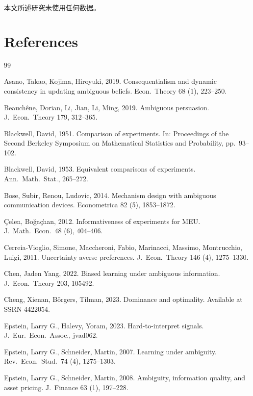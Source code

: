 \documentclass[12pt,a4paper]{article}
\newenvironment{translation}
  {\par\vspace{2pt}\noindent\color{myblue}\ignorespaces}
  {\par\vspace{6pt}}
\newcommand{\bisection}[2]{%
  \section{#1}%
  \vspace{-2pt}%
  \noindent{\color{myblue}\large\bfseries #2}%
  \vspace{6pt}%
}
\begin{document}
\begin{translation}
本文所述研究未使用任何数据。
\end{translation}


\bisection{References}{参考文献}

\begin{thebibliography}{99}

Asano, Takao, Kojima, Hiroyuki, 2019. Consequentialism and dynamic consistency in updating ambiguous beliefs. Econ.\ Theory 68 (1), 223--250.

Beauch\^{e}ne, Dorian, Li, Jian, Li, Ming, 2019. Ambiguous persuasion. J.\ Econ.\ Theory 179, 312--365.

Blackwell, David, 1951. Comparison of experiments. In: Proceedings of the Second Berkeley Symposium on Mathematical Statistics and Probability, pp.\ 93--102.

Blackwell, David, 1953. Equivalent comparisons of experiments. Ann.\ Math.\ Stat., 265--272.

Bose, Subir, Renou, Ludovic, 2014. Mechanism design with ambiguous communication devices. Econometrica 82 (5), 1853--1872.

\c{C}elen, Bo\u{g}a\c{c}han, 2012. Informativeness of experiments for MEU. J.\ Math.\ Econ.\ 48 (6), 404--406.

Cerreia-Vioglio, Simone, Maccheroni, Fabio, Marinacci, Massimo, Montrucchio, Luigi, 2011. Uncertainty averse preferences. J.\ Econ.\ Theory 146 (4), 1275--1330.

Chen, Jaden Yang, 2022. Biased learning under ambiguous information. J.\ Econ.\ Theory 203, 105492.

Cheng, Xienan, B\"{o}rgers, Tilman, 2023. Dominance and optimality. Available at SSRN 4422054.

Epstein, Larry G., Halevy, Yoram, 2023. Hard-to-interpret signals. J.\ Eur.\ Econ.\ Assoc., jvad062.

Epstein, Larry G., Schneider, Martin, 2007. Learning under ambiguity. Rev.\ Econ.\ Stud.\ 74 (4), 1275--1303.

Epstein, Larry G., Schneider, Martin, 2008. Ambiguity, information quality, and asset pricing. J.\ Finance 63 (1), 197--228.


\end{thebibliography}
\end{document}
